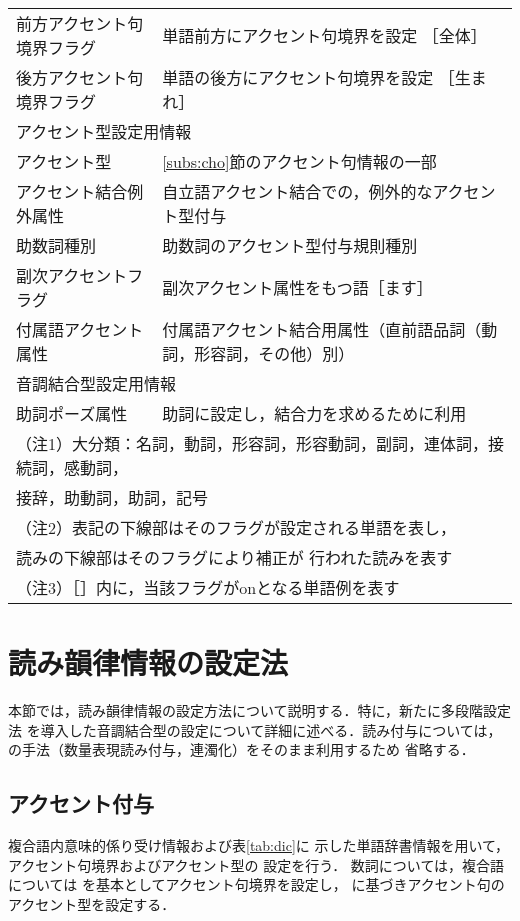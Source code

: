 \begin{table}[thb]
\begin{center}
\begin{tabular}{|l|l|}
\footnotesize{前方アクセント句境界フラグ} & 単語前方にアクセント句境界を設定 
［全体］ \\
\footnotesize{後方アクセント句境界フラグ} & 単語の後方にアクセント句境界を設定
［生まれ］\\ \hline
\multicolumn{2}{|l|}{アクセント型設定用情報} \\ \hline
アクセント型 & \ref{subs:cho}節のアクセント句情報の一部 \\ 
アクセント結合例外属性 & 自立語アクセント結合での，例外的なアクセント型付与 \\ 
助数詞種別 & 助数詞のアクセント型付与規則種別 \\
副次アクセントフラグ & 副次アクセント属性をもつ語［ます］ \\
付属語アクセント属性 & 付属語アクセント結合用属性（直前語品詞（動詞，形容詞，その他）別）\\ \hline
\multicolumn{2}{|l|}{音調結合型設定用情報} \\ \hline
助詞ポーズ属性 & 助詞に設定し，結合力を求めるために利用 \\\hline
\multicolumn{2}{l}{（注1）大分類：名詞，動詞，形容詞，形容動詞，副詞，連体詞，接続詞，感動詞，} \\
\multicolumn{2}{l}{\hspace*{2cm} 接辞，助動詞，助詞，記号}\\
\multicolumn{2}{l}{（注2）表記の下線部はそのフラグが設定される単語を表し，}\\
\multicolumn{2}{l}{\hspace*{1cm} 読みの下線部はそのフラグにより補正が
行われた読みを表す}\\
\multicolumn{2}{l}{（注3）［］内に，当該フラグがonとなる単語例を表す}
\end{tabular}
\end{center}
\end{table}

\normalsize

\section{読み韻律情報の設定法} \label{sec:assign}
本節では，読み韻律情報の設定方法について説明する．特に，新たに多段階設定法
を導入した音調結合型の設定について詳細に述べる．読み付与については，
\cite{Miyazaki1}の手法（数量表現読み付与，連濁化）をそのまま利用するため
省略する．
\subsection{アクセント付与}\label{subs:accent}
複合語内意味的係り受け情報および表\ref{tab:dic}に
示した単語辞書情報を用いて，アクセント句境界およびアクセント型の
設定を行う．
数詞については\cite{Miyazaki4}，複合語については
\cite{Miyazaki3}を基本としてアクセント句境界を設定し，
\cite{Sagisaka}に基づきアクセント句のアクセント型を設定する．

